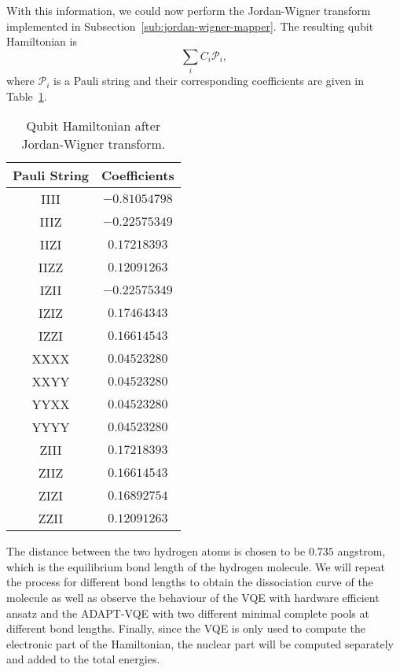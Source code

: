 With this information, we could now perform the Jordan-Wigner transform implemented in Subsection~\ref{sub:jordan-wigner-mapper}. The resulting qubit Hamiltonian is 
\[\sum_{i} C_i\mathcal{P}_i,\]
where $\mathcal{P}_i$ is a Pauli string and their corresponding coefficients are given in Table~\ref{tab:qubit-hamiltonian-h2}.
\begin{table}[h]
	\centering
	\caption{Qubit Hamiltonian after Jordan-Wigner transform.}
	\label{tab:qubit-hamiltonian-h2}


	\begin{tabular}{c c}
		\toprule
		\textbf{Pauli String} & \textbf{Coefficients} \\
		\midrule
		IIII & $-0.81054798$  \\ 
		IIIZ & $-0.22575349$  \\ 
		IIZI & $0.17218393$  \\ 
		IIZZ & $0.12091263$  \\ 
		IZII & $-0.22575349$  \\ 
		IZIZ & $0.17464343$  \\ 
		IZZI & $0.16614543$  \\ 
		XXXX & $0.04523280$  \\ 
		XXYY & $0.04523280$  \\ 
		YYXX & $0.04523280$  \\ 
		YYYY & $0.04523280$  \\ 
		ZIII & $0.17218393$  \\ 
		ZIIZ & $0.16614543$  \\ 
		ZIZI & $0.16892754$  \\ 
		ZZII & $0.12091263$  \\ 
		\bottomrule
	\end{tabular}
\end{table}

The distance between the two hydrogen atoms is chosen to be $ 0.735 $ angstrom, which is the equilibrium bond length of the hydrogen molecule. We will repeat the process for different bond lengths to obtain the dissociation curve of the molecule as well as observe the behaviour of the VQE with hardware efficient ansatz and the ADAPT-VQE with two different minimal complete pools at different bond lengths. Finally, since the VQE is only used to compute the electronic part of the Hamiltonian, the nuclear part will be computed separately and added to the total energies.


